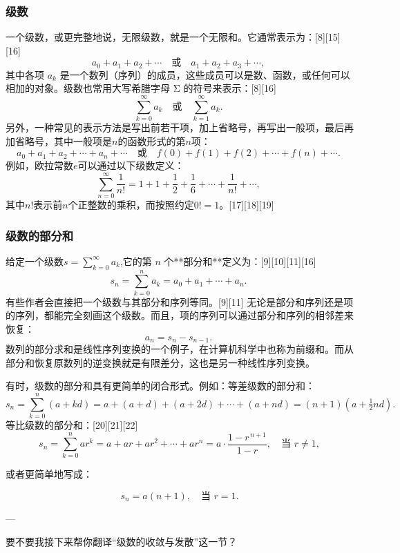 \subsubsection{级数}
一个级数，或更完整地说，无限级数，就是一个无限和。它通常表示为：[8][15][16]
$$
a_{0} + a_{1} + a_{2} + \cdots \quad \text{或} \quad a_{1} + a_{2} + a_{3} + \cdots ,~
$$
其中各项 $a_{k}$ 是一个数列（序列）的成员，这些成员可以是数、函数，或任何可以相加的对象。级数也常用大写希腊字母 Σ 的符号来表示：[8][16]
$$
\sum_{k=0}^{\infty} a_{k} \quad \text{或} \quad \sum_{k=1}^{\infty} a_{k}.~
$$
另外，一种常见的表示方法是写出前若干项，加上省略号，再写出一般项，最后再加省略号，其中一般项是$n$的函数形式的第$n$项：
$$
a_{0} + a_{1} + a_{2} + \cdots + a_{n} + \cdots 
\quad \text{或} \quad 
f(0) + f(1) + f(2) + \cdots + f(n) + \cdots .~
$$
例如，欧拉常数$e$可以通过以下级数定义：
$$
\sum_{n=0}^{\infty} \frac{1}{n!} 
= 1 + 1 + \frac{1}{2} + \frac{1}{6} + \cdots + \frac{1}{n!} + \cdots ,~
$$
其中$n!$表示前$n$个正整数的乘积，而按照约定$0! = 1$。[17][18][19]
\subsubsection{级数的部分和}
给定一个级数$s = \sum_{k=0}^{\infty} a_k $,它的第 $n$ 个**部分和**定义为：[9][10][11][16]
$$
s_{n} = \sum_{k=0}^{n} a_k = a_0 + a_1 + \cdots + a_n .~
$$
有些作者会直接把一个级数与其部分和序列等同。[9][11] 无论是部分和序列还是项的序列，都能完全刻画这个级数。而且，项的序列可以通过部分和序列的相邻差来恢复：
$$
a_{n} = s_{n} - s_{n-1}.~
$$
数列的部分求和是线性序列变换的一个例子，在计算机科学中也称为前缀和。而从部分和恢复原数列的逆变换就是有限差分，这也是另一种线性序列变换。

有时，级数的部分和具有更简单的闭合形式。例如：等差级数的部分和：
$$
s_{n} = \sum_{k=0}^{n} (a + kd) 
= a + (a+d) + (a+2d) + \cdots + (a+nd) 
= (n+1)\left(a + \tfrac{1}{2}nd\right) .~
$$
等比级数的部分和：[20][21][22]
$$
s_{n} = \sum_{k=0}^{n} ar^{k} 
= a + ar + ar^{2} + \cdots + ar^{n} 
= a \cdot \frac{1-r^{\,n+1}}{1-r}, \quad \text{当 } r \neq 1,
$$

或者更简单地写成：

$$
s_{n} = a(n+1), \quad \text{当 } r = 1.
$$

---

要不要我接下来帮你翻译“级数的收敛与发散”这一节？
